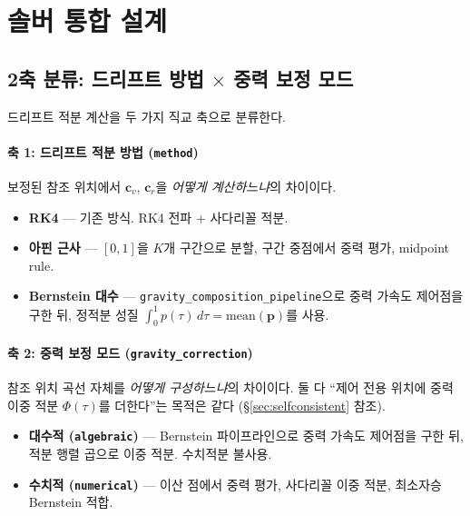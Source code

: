 \documentclass[11pt]{article}
\begin{document}
\section{솔버 통합 설계}

\subsection{2축 분류: 드리프트 방법 $\times$ 중력 보정 모드}

드리프트 적분 계산을 두 가지 직교 축으로 분류한다.

\paragraph{축 1: 드리프트 적분 방법 (\texttt{method})}
보정된 참조 위치에서 $\mathbf{c}_v$, $\mathbf{c}_r$을
\emph{어떻게 계산하느냐}의 차이이다.

\begin{itemize}
  \item \textbf{RK4} — 기존 방식. RK4 전파 + 사다리꼴 적분.
  \item \textbf{아핀 근사} — $[0,1]$을 $K$개 구간으로 분할,
        구간 중점에서 중력 평가, midpoint rule\cite{report009}.
  \item \textbf{Bernstein 대수} — \texttt{gravity\_composition\_pipeline}으로
        중력 가속도 제어점을 구한 뒤, 정적분 성질
        $\int_0^1 p(\tau)\,d\tau = \text{mean}(\mathbf{p})$를 사용\cite{report010}.
\end{itemize}

\paragraph{축 2: 중력 보정 모드 (\texttt{gravity\_correction})}
참조 위치 곡선 자체를 \emph{어떻게 구성하느냐}의 차이이다.
둘 다 ``제어 전용 위치에 중력 이중 적분 $\Phi(\tau)$를 더한다''는
목적은 같다 (\S\ref{sec:selfconsistent} 참조).

\begin{itemize}
  \item \textbf{대수적 (\texttt{algebraic})} — Bernstein 파이프라인으로
        중력 가속도 제어점을 구한 뒤, 적분 행렬 곱으로 이중 적분.
        수치적분 불사용.
  \item \textbf{수치적 (\texttt{numerical})} — 이산 점에서 중력 평가,
        사다리꼴 이중 적분, 최소자승 Bernstein 적합.
\end{itemize}
\end{document}

